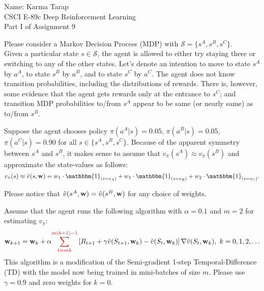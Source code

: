 \documentclass[12pt]{letter}
\begin{document}
\begin{flushleft}
{\sc Name: Karma Tarap}\\
CSCI E-89c Deep Reinforcement Learning\\
Part I of Assignment 9\\
\end{flushleft}

Please consider a Markov Decision Process (MDP) with  $\mathcal{S}=\{s^{A},s^{B},s^{C}\}$.\medskip\\
Given a particular state $s\in \mathcal{S}$, the agent is allowed to either try staying there or switching to any of the other states. Let's denote an intention to move to state $s^A$ by $a^A$, to state $s^B$ by $a^B$, and to state $s^C$ by $a^C$. The agent does not know transition probabilities, including the distributions of rewards. There is, however, some evidence that the agent gets rewards only at the entrance to $s^{C}$; and transition MDP probabilities to/from $s^{A}$ appear to be same (or nearly same) as to/from $s^{B}$. 

Suppose the agent chooses policy $\pi(a^A|s)=0.05$, $\pi(a^B|s)=0.05$, $\pi(a^C|s)=0.90$ for all $s\in\{s^A,s^B,s^C\}$. Because of the apparent symmetry between $s^A$ and $s^B$, it makes sense to assume that $v_\pi(s^A) \approx v_\pi(s^B)$ and approximate the state-values as follows:
$$v_\pi(s)\approx\hat{v}(s,{\bf w}) = w_1\cdot \mathbbm{1}_{(s=s_A)} + w_1\cdot \mathbbm{1}_{(s=s_B)} + w_2\cdot \mathbbm{1}_{(s=s_C)}.$$ 

Please notice that $\hat{v}(s^A,{\bf w})=\hat{v}(s^B,{\bf w})$ for any choice of weights.

Assume that the agent runs the following algorithm with $\alpha=0.1$ and $m=2$ for estimating $v_\pi$:
\begin{equation*}
\begin{aligned}
{\bf w}_{k+1} = {\bf w}_k + \alpha {\color{red}\sum_{t=mk}^{m(k+1)-1}}\left[R_{t+1}+ \gamma \hat{v}(S_{t+1},{\bf w}_k)-\hat{v}(S_t,{\bf w}_k)\right] \nabla \hat{v}(S_t,{\bf w}_k), ~k=0,1,2,\ldots
\end{aligned}
\end{equation*}
This algorithm is a modification of the Semi-gradient 1-step Temporal-Difference (TD) with the model now being trained in mini-batches of size $m$. Please use $\gamma=0.9$ and zero weights for $k=0$.
\end{document}
